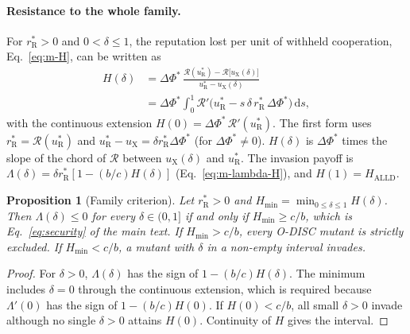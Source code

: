 \documentclass[10pt]{wlscirep}
\newcommand{\Rmap}{\mathscr{R}}            %
\newcommand{\rR}{r_{\mathrm{R}}^{*}}
\newcommand{\uR}{u_{\mathrm{R}}^{*}}
\newcommand{\uX}{u_{\mathrm{X}}}
\newcommand{\dPhi}{\Delta\Phi^{*}}
\newcommand{\Hmin}{H_{\min}}
\newcommand{\dd}{\mathrm{d}}
\newcommand{\ALLD}{\mathrm{ALLD}}
\theoremstyle{plain}
\newtheorem{proposition}[lemma]{Proposition}
\theoremstyle{remark}
\begin{document}
\paragraph{Resistance to the whole family.} For $\rR>0$ and $0<\delta\leq1$, the reputation lost per unit of withheld cooperation, Eq.~\eqref{eq:m-H}, can be written as
\begin{equation}
\begin{aligned}
H(\delta)&=\dPhi\,\frac{\Rmap(\uR)-\Rmap\bigl[\uX(\delta)\bigr]}{\uR-\uX(\delta)}\\
&=\dPhi\int_0^1\Rmap'\bigl(\uR-s\,\delta\,\rR\,\dPhi\bigr)\,\dd s,
\end{aligned}
\label{eq:s-H}
\end{equation}
with the continuous extension $H(0)=\dPhi\,\Rmap'(\uR)$. The first form uses $\rR=\Rmap(\uR)$ and $\uR-\uX=\delta\rR\dPhi$ (for $\dPhi\neq0$). $H(\delta)$ is $\dPhi$ times the slope of the chord of $\Rmap$ between $\uX(\delta)$ and $\uR$. The invasion payoff is $\Lambda(\delta)=\delta\rR[1-(b/c)H(\delta)]$ (Eq.~\eqref{eq:m-lambda-H}), and $H(1)=H_{\ALLD}$.

\begin{proposition}[Family criterion]\label{prop:family}
Let $\rR>0$ and $\Hmin=\min_{0\leq\delta\leq1}H(\delta)$. Then $\Lambda(\delta)\leq0$ for every $\delta\in(0,1]$ if and only if $\Hmin\geq c/b$, which is Eq.~\eqref{eq:security} of the main text. If $\Hmin>c/b$, every O-DISC mutant is strictly excluded. If $\Hmin<c/b$, a mutant with $\delta$ in a non-empty interval invades.
\end{proposition}
\begin{proof}
For $\delta>0$, $\Lambda(\delta)$ has the sign of $1-(b/c)H(\delta)$. The minimum includes $\delta=0$ through the continuous extension, which is required because $\Lambda'(0)$ has the sign of $1-(b/c)H(0)$. If $H(0)<c/b$, all small $\delta>0$ invade although no single $\delta>0$ attains $H(0)$. Continuity of $H$ gives the interval.
\end{proof}
\end{document}
